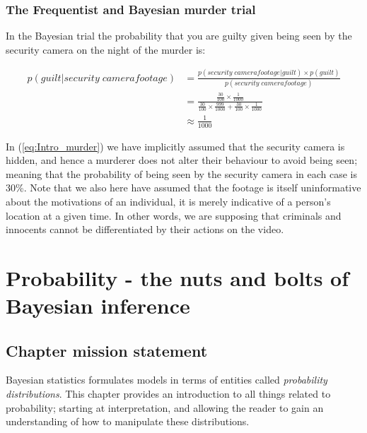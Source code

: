 \documentclass[11pt,fullpage]{book}
\begin{document}
\subsection{The Frequentist and Bayesian murder trial}\label{sec:Intro_appendixMurder}
In the Bayesian trial the probability that you are guilty given being seen by the security camera on the night of the murder is:

\begin{align}\label{eq:Intro_murder}
p(guilt|security\; camera footage) &= \frac{p(security\; camera footage|guilt)\times p(guilt)}{p(security\; camera footage)}\\
&= \frac{\frac{30}{100}\times \frac{1}{1000}}{\frac{30}{100}\times \frac{999}{1000}+\frac{30}{100}\times \frac{1}{1000}}\\
&\approx \frac{1}{1000}
\end{align}

In (\ref{eq:Intro_murder}) we have implicitly assumed that the security camera is hidden, and hence a murderer does not alter their behaviour to avoid being seen; meaning that the probability of being seen by the security camera in each case is 30\%. Note that we also here have assumed that the footage is itself uninformative about the motivations of an individual, it is merely indicative of a person's location at a given time. In other words, we are supposing that criminals and innocents cannot be differentiated by their actions on the video.

\chapter{Probability - the nuts and bolts of Bayesian inference}\label{chap:Probability}
\section{Chapter mission statement}
Bayesian statistics formulates models in terms of entities called \textit{probability distributions}. This chapter provides an introduction to all things related to probability; starting at interpretation, and allowing the reader to gain an understanding of how to manipulate these distributions.
\end{document}
